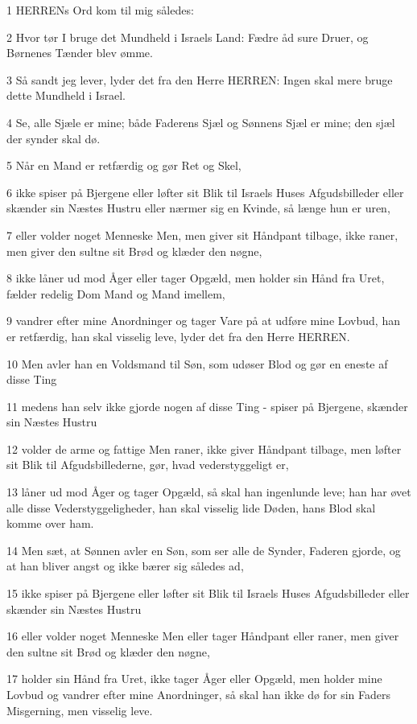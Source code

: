\par 1 HERRENs Ord kom til mig således:
\par 2 Hvor tør I bruge det Mundheld i Israels Land: Fædre åd sure Druer, og Børnenes Tænder blev ømme.
\par 3 Så sandt jeg lever, lyder det fra den Herre HERREN: Ingen skal mere bruge dette Mundheld i Israel.
\par 4 Se, alle Sjæle er mine; både Faderens Sjæl og Sønnens Sjæl er mine; den sjæl der synder skal dø.
\par 5 Når en Mand er retfærdig og gør Ret og Skel,
\par 6 ikke spiser på Bjergene eller løfter sit Blik til Israels Huses Afgudsbilleder eller skænder sin Næstes Hustru eller nærmer sig en Kvinde, så længe hun er uren,
\par 7 eller volder noget Menneske Men, men giver sit Håndpant tilbage, ikke raner, men giver den sultne sit Brød og klæder den nøgne,
\par 8 ikke låner ud mod Åger eller tager Opgæld, men holder sin Hånd fra Uret, fælder redelig Dom Mand og Mand imellem,
\par 9 vandrer efter mine Anordninger og tager Vare på at udføre mine Lovbud, han er retfærdig, han skal visselig leve, lyder det fra den Herre HERREN.
\par 10 Men avler han en Voldsmand til Søn, som udøser Blod og gør en eneste af disse Ting
\par 11 medens han selv ikke gjorde nogen af disse Ting - spiser på Bjergene, skænder sin Næstes Hustru
\par 12 volder de arme og fattige Men raner, ikke giver Håndpant tilbage, men løfter sit Blik til Afgudsbillederne, gør, hvad vederstyggeligt er,
\par 13 låner ud mod Åger og tager Opgæld, så skal han ingenlunde leve; han har øvet alle disse Vederstyggeligheder, han skal visselig lide Døden, hans Blod skal komme over ham.
\par 14 Men sæt, at Sønnen avler en Søn, som ser alle de Synder, Faderen gjorde, og at han bliver angst og ikke bærer sig således ad,
\par 15 ikke spiser på Bjergene eller løfter sit Blik til Israels Huses Afgudsbilleder eller skænder sin Næstes Hustru
\par 16 eller volder noget Menneske Men eller tager Håndpant eller raner, men giver den sultne sit Brød og klæder den nøgne,
\par 17 holder sin Hånd fra Uret, ikke tager Åger eller Opgæld, men holder mine Lovbud og vandrer efter mine Anordninger, så skal han ikke dø for sin Faders Misgerning, men visselig leve.
